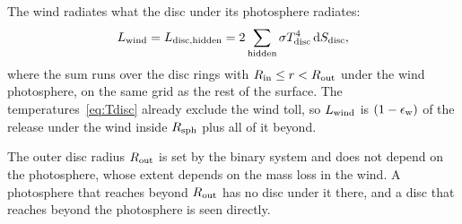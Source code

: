 The wind radiates what the disc under its photosphere radiates:
\begin{equation}
L_{\rm wind} = L_{\rm disc,hidden} = 2\sum_{\rm hidden} \sigma T_{\rm disc}^4\,{\rm d}S_{\rm disc} ,
\label{eq:Lwind}
\end{equation}
where the sum runs over the disc rings with $R_{\rm in} \le r < R_{\rm out}$ under the wind photosphere, on the same grid as the rest of the surface.
The temperatures~\eqref{eq:Tdisc} already exclude the wind toll, so $L_{\rm wind}$ is $(1 - \epsilon_{\rm w})$ of the release under the wind inside $R_{\rm sph}$ plus all of it beyond.

The outer disc radius $R_{\rm out}$ is set by the binary system and does not depend on the photosphere, whose extent depends on the mass loss in the wind.
A photosphere that reaches beyond $R_{\rm out}$ has no disc under it there, and a disc that reaches beyond the photosphere is seen directly.

